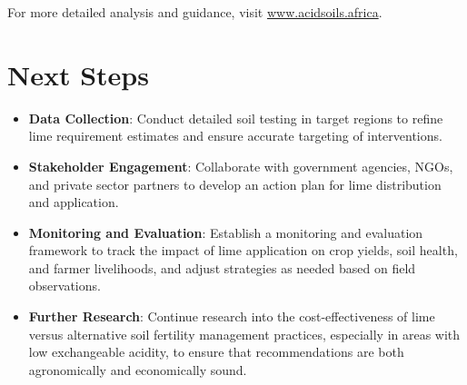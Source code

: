 \documentclass[openany
]{book}
\begin{document}
For more detailed analysis and guidance, visit \href{https://www.acidsoils.africa}{www.acidsoils.africa}.

\section*{Next Steps}
\begin{itemize}
\item \textbf{Data Collection}: Conduct detailed soil testing in target regions to refine lime requirement estimates and ensure accurate targeting of interventions.
\item \textbf{Stakeholder Engagement}: Collaborate with government agencies, NGOs, and private sector partners to develop an action plan for lime distribution and application.
\item \textbf{Monitoring and Evaluation}: Establish a monitoring and evaluation framework to track the impact of lime application on crop yields, soil health, and farmer livelihoods, and adjust strategies as needed based on field observations.
\item \textbf{Further Research}: Continue research into the cost-effectiveness of lime versus alternative soil fertility management practices, especially in areas with low exchangeable acidity, to ensure that recommendations are both agronomically and economically sound.
\end{itemize}
\end{document}
